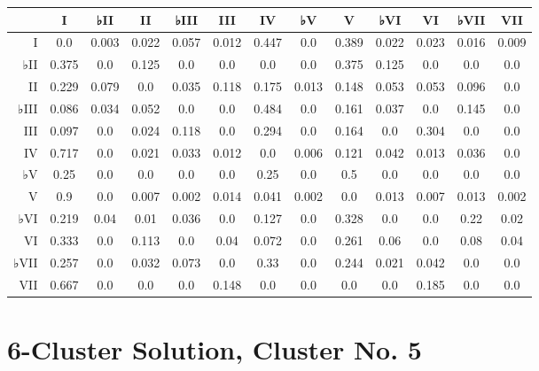 \begin{table}[htbp]
\begin{minipage}{\linewidth}
\setlength{\tymax}{0.5\linewidth}
\centering
\small
\begin{tabulary}{\textwidth}{@{}RCCCCCCCCCCCC@{}} \toprule
&I&♭II&II&♭III&III&IV&♭V&V&♭VI&VI&♭VII&VII\\
\midrule
I&0.0&0.003&0.022&0.057&0.012&0.447&0.0&0.389&0.022&0.023&0.016&0.009\\
♭II&0.375&0.0&0.125&0.0&0.0&0.0&0.0&0.375&0.125&0.0&0.0&0.0\\
II&0.229&0.079&0.0&0.035&0.118&0.175&0.013&0.148&0.053&0.053&0.096&0.0\\
♭III&0.086&0.034&0.052&0.0&0.0&0.484&0.0&0.161&0.037&0.0&0.145&0.0\\
III&0.097&0.0&0.024&0.118&0.0&0.294&0.0&0.164&0.0&0.304&0.0&0.0\\
IV&0.717&0.0&0.021&0.033&0.012&0.0&0.006&0.121&0.042&0.013&0.036&0.0\\
♭V&0.25&0.0&0.0&0.0&0.0&0.25&0.0&0.5&0.0&0.0&0.0&0.0\\
V&0.9&0.0&0.007&0.002&0.014&0.041&0.002&0.0&0.013&0.007&0.013&0.002\\
♭VI&0.219&0.04&0.01&0.036&0.0&0.127&0.0&0.328&0.0&0.0&0.22&0.02\\
VI&0.333&0.0&0.113&0.0&0.04&0.072&0.0&0.261&0.06&0.0&0.08&0.04\\
♭VII&0.257&0.0&0.032&0.073&0.0&0.33&0.0&0.244&0.021&0.042&0.0&0.0\\
VII&0.667&0.0&0.0&0.0&0.148&0.0&0.0&0.0&0.0&0.185&0.0&0.0\\

\bottomrule

\end{tabulary}
\end{minipage}
\end{table}

\section{6-Cluster Solution, Cluster No. 5}
\label{6-clustersolutionclusterno.5}

